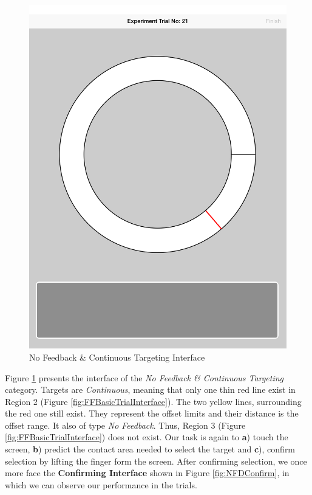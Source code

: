 \begin{figure}[H]
\centering
\includegraphics[scale=0.07]{figures/NFND.png}
\caption{No Feedback \& Continuous Targeting Interface}
\label{fig:NFND}
\end{figure}

Figure \ref{fig:NFND} presents the interface of the \emph{No Feedback \& Continuous Targeting} category. Targets are \emph{Continuous}, meaning that only one thin red line exist in Region 2 (Figure \ref{fig:FFBasicTrialInterface}). The two yellow lines, surrounding the red one still exist. They represent the offset limits and their distance is the offset range. It also of type \emph{No Feedback}. Thus, Region 3 (Figure \ref{fig:FFBasicTrialInterface}) does not exist. Our task is again to \textbf{a}) touch the screen, \textbf{b}) predict the contact area needed to select the target and \textbf{c}), confirm selection by lifting the finger form the screen. After confirming selection, we once more face the \textbf{Confirming Interface} shown in Figure \ref{fig:NFDConfirm}, in which we can observe our performance in the trials. 




